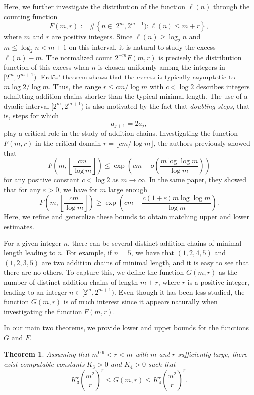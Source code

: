 \documentclass{article}
\newtheorem{theorem}{Theorem}
\theoremstyle{definition}
\begin{document}
Here, we further investigate the distribution of the function $\ell(n)$ through the counting function
$$
F(m,r):=\#\left\{n\in [2^m, 2^{m+1}):\ell(n)\leq m+r\right\},
$$
where $m$ and $r$ are positive integers. Since $\ell(n)\ge \log_2 n$ and $m\le \log_2 n<m+1$ on this interval, it is natural to study the excess $\ell(n)-m$. The normalized count $2^{-m}F(m,r)$ is precisely the distribution function of this excess when $n$ is chosen uniformly among the integers in $[2^m,2^{m+1})$. Erd\H{o}s' theorem shows that the
excess is typically asymptotic to $m\log 2/\log m$.
Thus, the range $r\le cm/\log m$ with $c<\log 2$ describes integers admitting addition chains shorter than the typical minimal length.
The use of a dyadic interval $[2^m,2^{m+1})$ is also motivated by the fact that {\it doubling steps}, that is, steps for which
$$
a_{j+1}=2a_j,
$$
play a critical role in the study of addition chains.
Investigating the function $F(m,r)$ in the critical domain $r=\lfloor cm/\log m \rfloor$, the authors previously showed \cite{DKN} that
$$
F\left(m,\left\lfloor \frac{cm}{\log m}\right\rfloor\right)\le \exp\left(cm+o\left(\frac{m\log\log m}{\log m}\right)\right)
$$
for any positive constant $c<\log 2$ as $m\to\infty$.
In the same paper, they showed that for any $\varepsilon>0$,  we have for $m$ large enough
$$
F\left(m,\left\lfloor \frac{cm}{\log m}\right\rfloor\right)\ge \exp\left(cm-\frac{c(1+\varepsilon) m\log\log m}{\log m}\right).
$$
Here, we refine and generalize these bounds to  obtain matching upper and lower estimates.

For a given integer $n$, there can be several distinct addition chains of minimal length leading to $n$.  For example, if $n=5$, we have that $(1,2,4,5)$ and $(1,2,3,5)$  are two addition chains of minimal length, and it is easy to see that there are no others. To capture this, we define the function $G(m,r)$ as the number of distinct addition chains of length  $ m+r$, where $r$ is a positive integer, leading to an integer $n\in [2^m, 2^{m+1})$. 
Even though it has been less studied, the function $G(m,r)$   is of much interest since it appears naturally when investigating the function $F(m,r)$.

In our main two theorems, we provide lower and upper bounds  for the functions $G$ and $F$.


\begin{theorem} \label{t1} Assuming that $m^{0.9}<r<m$ with $m$ and $r$ sufficiently large, there exist  computable constants $K_3>0$  and $K_4>0$ such that
$$
K_3^r \left(\frac{m^2}{r}\right)^r\le G(m,r)\le K_4^r \left(\frac{m^2}{r}\right)^r.
$$
\end{theorem}
\end{document}
